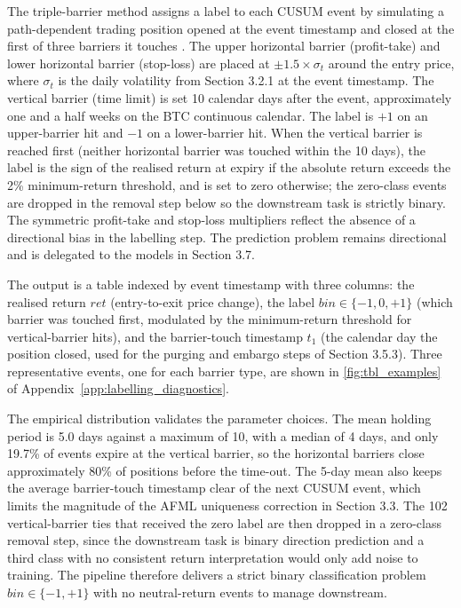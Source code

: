 The triple-barrier method assigns a label to each CUSUM event by simulating a path-dependent trading position opened at the event timestamp and closed at the first of three barriers it touches \citep[Snippet 3.2]{lopez_de_prado_2018}. The upper horizontal barrier (profit-take) and lower horizontal barrier (stop-loss) are placed at $\pm 1.5 \times \sigma_t$ around the entry price, where $\sigma_t$ is the daily volatility from Section 3.2.1 at the event timestamp. The vertical barrier (time limit) is set 10 calendar days after the event, approximately one and a half weeks on the BTC continuous calendar. The label is $+1$ on an upper-barrier hit and $-1$ on a lower-barrier hit. When the vertical barrier is reached first (neither horizontal barrier was touched within the 10 days), the label is the sign of the realised return at expiry if the absolute return exceeds the 2\% minimum-return threshold, and is set to zero otherwise; the zero-class events are dropped in the removal step below so the downstream task is strictly binary. The symmetric profit-take and stop-loss multipliers reflect the absence of a directional bias in the labelling step. The prediction problem remains directional and is delegated to the models in Section 3.7.

The output is a table indexed by event timestamp with three columns: the realised return $ret$ (entry-to-exit price change), the label $bin \in \{-1, 0, +1\}$ (which barrier was touched first, modulated by the minimum-return threshold for vertical-barrier hits), and the barrier-touch timestamp $t_1$ (the calendar day the position closed, used for the purging and embargo steps of Section 3.5.3). Three representative events, one for each barrier type, are shown in \label{ref:tbl_examples_call}\autoref{fig:tbl_examples} of Appendix~\ref{app:labelling_diagnostics}.

The empirical distribution validates the parameter choices. The mean holding period is 5.0 days against a maximum of 10, with a median of 4 days, and only 19.7\% of events expire at the vertical barrier, so the horizontal barriers close approximately 80\% of positions before the time-out. The 5-day mean also keeps the average barrier-touch timestamp clear of the next CUSUM event, which limits the magnitude of the AFML uniqueness correction in Section 3.3. The 102 vertical-barrier ties that received the zero label are then dropped in a zero-class removal step, since the downstream task is binary direction prediction and a third class with no consistent return interpretation would only add noise to training. The pipeline therefore delivers a strict binary classification problem $bin \in \{-1, +1\}$ with no neutral-return events to manage downstream.

